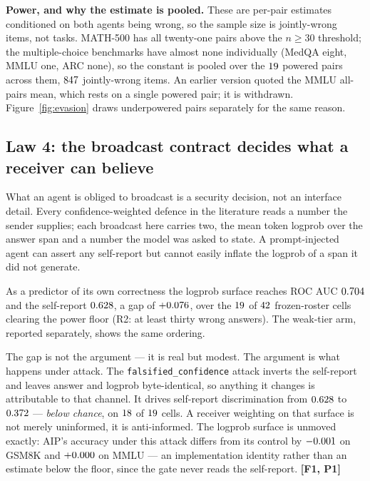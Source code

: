 \textbf{Power, and why the estimate is pooled.} These are per-pair estimates
conditioned on both agents being wrong, so the sample size is jointly-wrong
items, not tasks. MATH-500 has all twenty-one pairs above the $n \geq 30$
threshold; the multiple-choice benchmarks have almost none individually (MedQA
eight, MMLU one, ARC none), so the constant is pooled over the
$19$ powered pairs across them, $847$
jointly-wrong items. An earlier version quoted the MMLU all-pairs mean, which
rests on a single powered pair; it is withdrawn. Figure~\ref{fig:evasion} draws
underpowered pairs separately for the same reason.

\subsection{Law 4: the broadcast contract decides what a receiver can believe}
\label{sec:protocol}

What an agent is obliged to broadcast is a security decision, not an interface
detail. Every confidence-weighted defence in the literature reads a number the
sender supplies; each broadcast here carries two, the mean token logprob over the
answer span and a number the model was asked to state. A prompt-injected agent
can assert any self-report but cannot easily inflate the logprob of a span it did
not generate.

As a predictor of its own correctness the logprob surface reaches ROC AUC
$0.704$ and the self-report $0.628$, a gap of $+0.076$,
over the $19$ of $42$ frozen-roster cells clearing
the power floor (R2: at least thirty wrong answers). The weak-tier arm, reported
separately, shows the same ordering.

The gap is not the argument --- it is real but modest. The argument is what
happens under attack. The \texttt{falsified\_confidence} attack inverts the
self-report and leaves answer and logprob byte-identical, so anything it changes
is attributable to that channel. It drives self-report discrimination from
$0.628$ to $0.372$ --- \emph{below chance}, on
$18$ of $19$ cells. A receiver weighting on
that surface is not merely uninformed, it is anti-informed. The logprob surface is
unmoved exactly: AIP's accuracy under this attack differs from its control by
$-0.001$ on GSM8K and $+0.000$ on MMLU --- an
implementation identity rather than an estimate below the floor, since the gate
never reads the self-report. \textbf{[F1, P1]}

